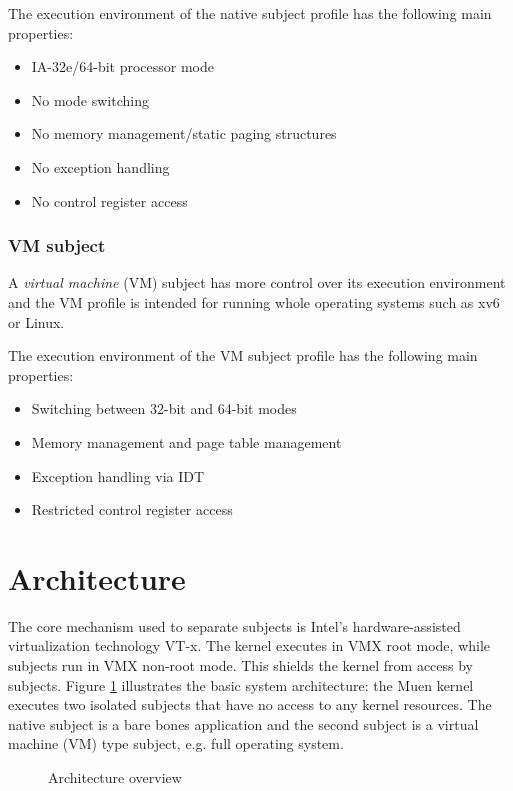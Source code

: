 The execution environment of the native subject profile has the following main
properties:

\begin{itemize}
	\item IA-32e/64-bit processor mode
	\item No mode switching
	\item No memory management/static paging structures
	\item No exception handling
	\item No control register access
\end{itemize}

\subsubsection{VM subject}
A \emph{virtual machine} (VM) subject has more control over its execution
environment and the VM profile is intended for running whole operating systems
such as xv6 or Linux.

The execution environment of the VM subject profile has the following main
properties:

\begin{itemize}
	\item Switching between 32-bit and 64-bit modes
	\item Memory management and page table management
	\item Exception handling via IDT
	\item Restricted control register access
\end{itemize}

\section{Architecture}
The core mechanism used to separate subjects is Intel's hardware-assisted
virtualization technology VT-x. The kernel executes in VMX root mode, while
subjects run in VMX non-root mode. This shields the kernel from access by
subjects. Figure \ref{fig:architecture-overview} illustrates the basic system
architecture: the Muen kernel executes two isolated subjects that have no access
to any kernel resources. The native subject is a bare bones application and the
second subject is a virtual machine (VM) type subject, e.g. full operating
system.

\begin{figure}[h]
	\centering
	
	\caption{Architecture overview}
	\label{fig:architecture-overview}
\end{figure}

